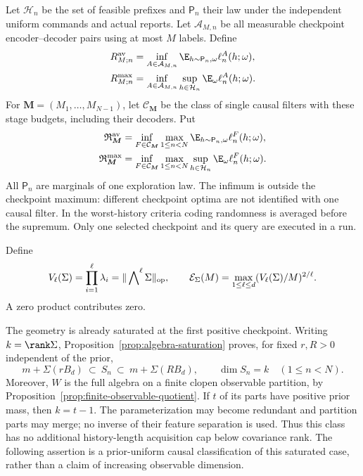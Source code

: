 \begin{definition}
\label{def:algebra-risks}
Let $\mathcal H_n$ be the set of feasible prefixes and $\mathsf P_n$
their law under the independent uniform commands and actual reports.
Let $\mathcal A_{M,n}$ be all measurable checkpoint encoder--decoder
pairs using at most $M$ labels. Define
\begin{align}
 R^{\rm av}_{M;n}
  &=\inf_{A\in\mathcal A_{M,n}}
                 \E_{h\sim\mathsf P_n,\omega}\ell_n^A(h;\omega),
       \label{eq:algebra-risk-average}\\
 R^{\rm max}_{M;n}
  &=\inf_{A\in\mathcal A_{M,n}}\sup_{h\in\mathcal H_n}
                 \E_\omega\ell_n^A(h;\omega).
       \label{eq:algebra-risk-worst}
\end{align}
For $\boldsymbol M=(M_1,\ldots,M_{N-1})$, let
$\mathcal C_{\boldsymbol M}$ be the class of single causal filters with
these stage budgets, including their decoders. Put
\begin{align}
 \mathfrak R^{\rm av}_{\boldsymbol M}
  &=\inf_{F\in\mathcal C_{\boldsymbol M}}\max_{1\le n<N}
                  \E_{h\sim\mathsf P_n,\omega}\ell_n^F(h;\omega),
       \label{eq:algebra-risk-causal-average}\\
 \mathfrak R^{\rm max}_{\boldsymbol M}
  &=\inf_{F\in\mathcal C_{\boldsymbol M}}\max_{1\le n<N}
       \sup_{h\in\mathcal H_n}\E_\omega\ell_n^F(h;\omega).
       \label{eq:algebra-risk-causal-worst}
\end{align}
All $\mathsf P_n$ are marginals of one exploration law. The infimum is
outside the checkpoint maximum: different checkpoint optima are not
identified with one causal filter. In the worst-history criteria coding
randomness is averaged before the supremum. Only one selected checkpoint
and its query are executed in a run.
\end{definition}

Define
\begin{equation}\label{eq:algebra-profile}
 V_\ell(\Sigma)=\prod_{i=1}^\ell\lambda_i
       =\|\mathop{\bigwedge}\nolimits^\ell\Sigma\|_{\rm op},
 \qquad
 \mathcal E_\Sigma(M)=\max_{1\le\ell\le d}
                   (V_\ell(\Sigma)/M)^{2/\ell}.
\end{equation}
A zero product contributes zero.

The geometry is already saturated at the first positive checkpoint.
Writing $k=\rank\Sigma$, Proposition~\ref{prop:algebra-saturation}
proves, for fixed $r,R>0$ independent of the prior,
\[
 m+\Sigma(rB_d)\ \subset\ S_n\ \subset\ m+\Sigma(RB_d),
                    \qquad \dim S_n=k\quad(1\le n<N).
\]
Moreover, $W$ is the full algebra on a finite clopen observable
partition, by Proposition~\ref{prop:finite-observable-quotient}.
If $t$ of its parts have positive prior mass, then $k=t-1$.
The parameterization may become redundant and partition parts may merge;
no inverse of their feature separation is used. Thus this class has no
additional history-length acquisition cap below covariance rank. The
following assertion is a prior-uniform causal classification of this
saturated case, rather than a claim of increasing observable dimension.

